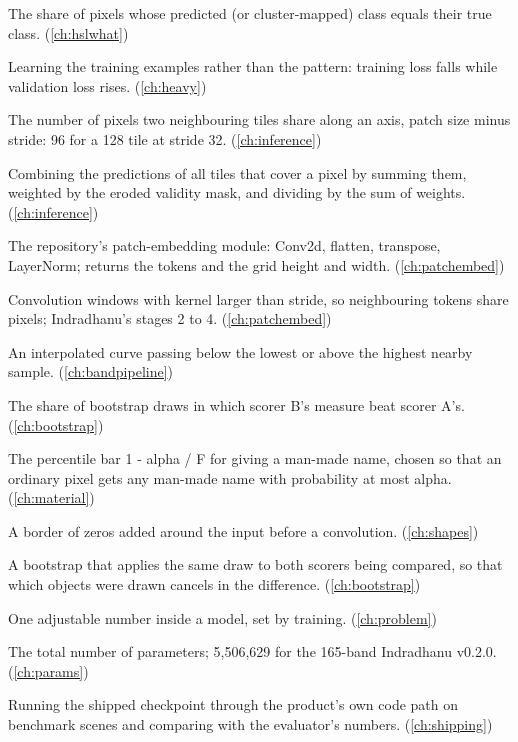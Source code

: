 \begin{description}[style=nextline,leftmargin=1.2em,font=\normalfont\bfseries]
\item[Overall accuracy] The share of pixels whose predicted (or cluster-mapped) class equals their true class. (\cref{ch:hslwhat})
\item[Overfitting] Learning the training examples rather than the pattern: training loss falls while validation loss rises. (\cref{ch:heavy})
\item[Overlap] The number of pixels two neighbouring tiles share along an axis, patch size minus stride: 96 for a 128 tile at stride 32. (\cref{ch:inference})
\item[Overlap averaging] Combining the predictions of all tiles that cover a pixel by summing them, weighted by the eroded validity mask, and dividing by the sum of weights. (\cref{ch:inference})
\item[OverlapPatchEmbedding] The repository's patch-embedding module: Conv2d, flatten, transpose, LayerNorm; returns the tokens and the grid height and width. (\cref{ch:patchembed})
\item[Overlapping windows] Convolution windows with kernel larger than stride, so neighbouring tokens share pixels; Indradhanu's stages 2 to 4. (\cref{ch:patchembed})
\item[Overshoot] An interpolated curve passing below the lowest or above the highest nearby sample. (\cref{ch:bandpipeline})
\item[P(B>A)] The share of bootstrap draws in which scorer B's measure beat scorer A's. (\cref{ch:bootstrap})
\item[p*] The percentile bar 1 - alpha / F for giving a man-made name, chosen so that an ordinary pixel gets any man-made name with probability at most alpha. (\cref{ch:material})
\item[Padding] A border of zeros added around the input before a convolution. (\cref{ch:shapes})
\item[Paired bootstrap] A bootstrap that applies the same draw to both scorers being compared, so that which objects were drawn cancels in the difference. (\cref{ch:bootstrap})
\item[Parameter] One adjustable number inside a model, set by training. (\cref{ch:problem})
\item[Parameter count] The total number of parameters; 5,506,629 for the 165-band Indradhanu v0.2.0. (\cref{ch:params})
\item[Parity run] Running the shipped checkpoint through the product's own code path on benchmark scenes and comparing with the evaluator's numbers. (\cref{ch:shipping})

\end{description}
